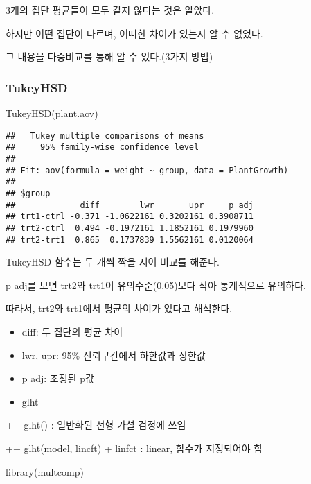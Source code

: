 \documentclass[
]{article}
\newenvironment{Shaded}{\begin{snugshade}}{\end{snugshade}}
\newcommand{\FunctionTok}[1]{\textcolor[rgb]{0.00,0.00,0.00}{#1}}
\newcommand{\NormalTok}[1]{#1}
\begin{document}
3개의 집단 평균들이 모두 같지 않다는 것은 알았다.

하지만 어떤 집단이 다르며, 어떠한 차이가 있는지 알 수 없었다.

그 내용을 다중비교를 통해 알 수 있다.(3가지 방법)

\hypertarget{tukeyhsd}{%
\subsubsection{TukeyHSD}\label{tukeyhsd}}

\begin{Shaded}
\begin{Highlighting}[]
\FunctionTok{TukeyHSD}\NormalTok{(plant.aov)}
\end{Highlighting}
\end{Shaded}

\begin{verbatim}
##   Tukey multiple comparisons of means
##     95% family-wise confidence level
## 
## Fit: aov(formula = weight ~ group, data = PlantGrowth)
## 
## $group
##             diff        lwr       upr     p adj
## trt1-ctrl -0.371 -1.0622161 0.3202161 0.3908711
## trt2-ctrl  0.494 -0.1972161 1.1852161 0.1979960
## trt2-trt1  0.865  0.1737839 1.5562161 0.0120064
\end{verbatim}

TukeyHSD 함수는 두 개씩 짝을 지어 비교를 해준다.

p adj를 보면 trt2와 trt1이 유의수준(0.05)보다 작아 통계적으로 유의하다.

따라서, trt2와 trt1에서 평균의 차이가 있다고 해석한다.

\begin{itemize}
\item
  diff: 두 집단의 평균 차이
\item
  lwr, upr: 95\% 신뢰구간에서 하한값과 상한값
\item
  p adj: 조정된 p값
\item
  glht
\end{itemize}

++ glht() : 일반화된 선형 가설 검정에 쓰임

++ glht(model, lincft)
+ linfct : linear, 함수가 지정되어야 함

\begin{Shaded}
\begin{Highlighting}[]
\FunctionTok{library}\NormalTok{(multcomp)}
\end{Highlighting}
\end{Shaded}
\end{document}
